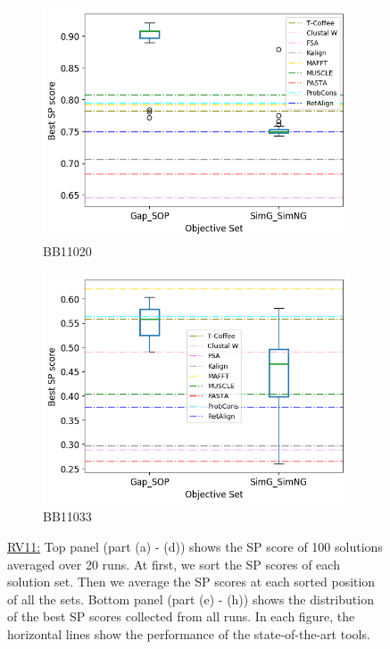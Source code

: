 \begin{figure}[!htbp]
\begin{adjustwidth}{-1cm}{-1cm}
\begin{subfigure}{0.22\textwidth}
			\includegraphics[width=\columnwidth]{Figure/summary/precomputedInit/Balibase/BB11020_objset_pairs_rank_2}
			\caption{BB11020}
		\end{subfigure}
		\begin{subfigure}{0.22\textwidth}
			\includegraphics[width=\columnwidth]{Figure/summary/precomputedInit/Balibase/BB11033_objset_pairs_rank_2}
			\caption{BB11033}
		\end{subfigure}
		\caption{\underline{RV11:} Top panel (part (a) - (d)) shows the SP score of 100 solutions averaged over 20 runs. At first, we sort the SP scores of each solution set. Then we average the SP scores at each sorted position of all the sets. Bottom panel (part (e) - (h)) shows the distribution of the best SP scores collected from all runs. In each figure, the horizontal lines show the performance of the state-of-the-art tools.}
		\label{fig:rv11_sp}
	\end{adjustwidth}
\end{figure}


